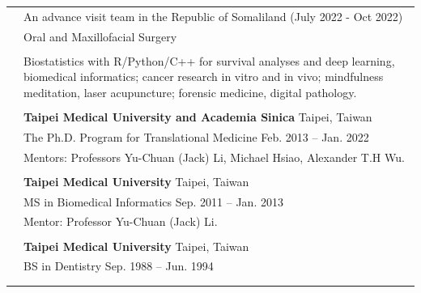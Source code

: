\documentclass[letterpaper, 11pt]{article}
\begin{document}

\setlength{\tabcolsep}{8pt}

\begin{longtable}{p{1.3in}p{4.8in}}

\nohyphens{\color{OliveGreen}{Speciality}}
& An advance visit team in the Republic of Somaliland \hfill (July 2022 - Oct 2022) \\
& Oral and Maxillofacial Surgery 
\\
& \\


\nohyphens{\color{OliveGreen}{Research interests}}
& Biostatistics with R/Python/C++ for survival analyses and deep learning, biomedical informatics; cancer research in vitro and in vivo; mindfulness meditation, laser acupuncture; forensic medicine, digital pathology. \\
& \\


\color{OliveGreen}{Education} 
& \textbf{Taipei Medical University and Academia Sinica} \hfill Taipei, Taiwan \\ 
& The Ph.D. Program for Translational Medicine \hfill Feb. 2013 -- Jan. 2022 \\
& Mentors: Professors Yu-Chuan (Jack) Li, Michael Hsiao, Alexander T.H Wu. \\
& \\

& \textbf{Taipei Medical University} \hfill Taipei, Taiwan \\
& MS in Biomedical Informatics \hfill Sep. 2011 -- Jan. 2013\\
& Mentor: Professor Yu-Chuan (Jack) Li.\\ %
& \\

& \textbf{Taipei Medical University} \hfill Taipei, Taiwan \\
& BS in Dentistry \hfill Sep. 1988 -- Jun. 1994 \\
& \\%
& \\


\end{longtable}
\end{document}
